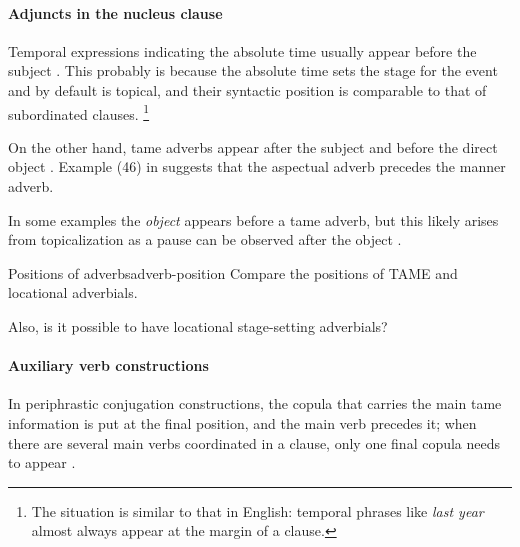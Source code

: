 \documentclass[a4paper, oneside, 12pt]{report}
\newcommand*{\citepage}[1]{p.~{#1}}
\newcommand*{\citepages}[1]{pp.~{#1}}
\newcommand{\form}[1]{\emph{#1}}
\begin{document}
\paragraph*{Adjuncts in the nucleus clause}\label{sec:grammatical.clause.template.adverb}
Temporal expressions indicating the absolute time usually appear before the subject
\citep[\citepage{344}, (167); \citepage{283}, (123)]{jacques2021grammar}.
This probably is because the absolute time sets the stage for the event
and by default is topical,
and their syntactic position is comparable to that of subordinated clauses.%
\footnote{
    The situation is similar to that in English:
    temporal phrases like \form{last year} almost always appear at the margin of a clause.
}

On the other hand, \ac{tame} adverbs
appear after the subject and before the direct object
\citep[\citepages{1200-1201,1210}]{jacques2021grammar}.
Example (46) in \citet[\citepage{1200}]{jacques2021grammar}
suggests that the aspectual adverb precedes the manner adverb.

In some examples the \emph{object} appears before a \ac{tame} adverb,
but this likely arises from topicalization as a pause can be observed after the object
\citep[\citepage{1210}, (82)]{jacques2021grammar}.

\begin{todobox}{Positions of adverbs}{adverb-position}
    Compare the positions of TAME and locational adverbials.
    
    Also, is it possible to have locational stage-setting adverbials?
\end{todobox}

\paragraph*{Auxiliary verb constructions}
In periphrastic conjugation constructions, 
the copula that carries the main \ac{tame} information 
is put at the final position, 
and the main verb precedes it; 
when there are several main verbs coordinated in a clause, 
only one final copula needs to appear \citep[\citepages{1090-1091}]{jacques2021grammar}.
\end{document}
